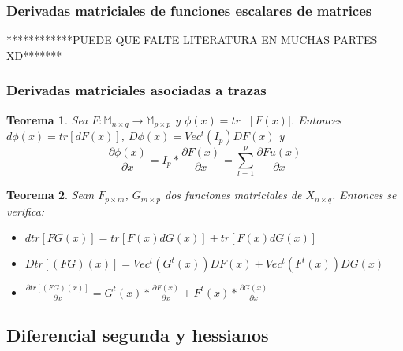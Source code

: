 \documentclass{article}
\theoremstyle{theorem-style}  %
\newtheorem{theorem}{Teorema}[section]  %
\theoremstyle{definition-style}
\theoremstyle{example-style}
\theoremstyle{exercise-style}
\begin{document}
\subsubsection{Derivadas matriciales de funciones escalares de matrices}


************PUEDE QUE FALTE LITERATURA EN MUCHAS PARTES XD*******

\subsubsection*{Derivadas matriciales asociadas a trazas}

\begin{theorem}
	Sea $F:\mathbb{M}_{n\times q}\rightarrow \mathbb{M}_{p\times p}$ y $\phi (x) = tr[]F(x)]$. Entonces $d\phi(x)= tr[dF(x)]$, $D\phi(x)= Vec^t(I_p)DF(x)$ y 
	$$ \frac{\partial \phi(x)}{\partial x} = I_p* \frac{\partial F(x)}{\partial x} = \sum_{l=1}^{p} \frac{\partial Fu(x)}{\partial x} $$ 
\end{theorem}

\begin{theorem}
	Sean $F_{p\times m}$, $G_{m\times p}$ dos funciones matriciales de $X_{n\times q}$. Entonces se verifica:
	\begin{itemize}
		\item $dtr[FG(x)] = tr[F(x)dG(x)]+ tr[F(x)dG(x)]$
		\item $Dtr[(FG)(x)] = Vec^t(G^t(x))DF(x) + Vec^t(F^t(x))DG(x)$
		\item $ \frac{\partial tr[(FG)(x)]}{\partial x} = G^t(x) * \frac{\partial F(x)}{\partial x} + F^t(x) * \frac{\partial G(x)}{\partial x}$
	\end{itemize}
\end{theorem}



\subsection{Diferencial segunda y hessianos}


	
\end{document}
